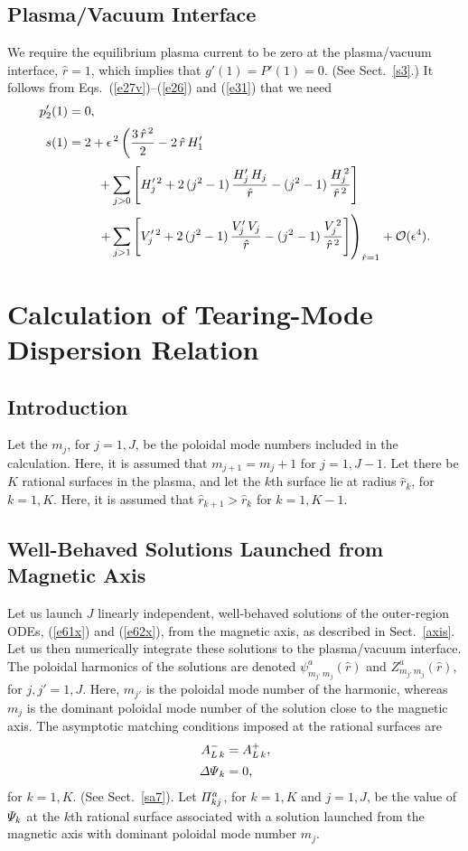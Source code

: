 \documentclass[12pt,prb,aps]{revtex4-1}
\begin{document}
\subsection{Plasma/Vacuum Interface}
We require the equilibrium plasma current to be zero at the plasma/vacuum interface, $\hat{r}=1$, which
implies that $g'(1)=P'(1)= 0$. (See Sect.~\ref{s3}.) It follows from Eqs.~(\ref{e27v})--(\ref{e26}) and (\ref{e31}) that we need\,\cite{am1}
\begin{align}
p_2'(1) &= 0,\label{e222}\\[0.5ex]
s(1) &= 2+ \epsilon^{\,2}\left(\frac{3\,\hat{r}^{\,2}}{2}-2\,\hat{r}\,H_1'\right.\nonumber\\[0.5ex]
&\phantom{===}
+\sum_{j>0}\left[H_j'^{\,2}+2\,(j^2-1)\,\frac{H_j'\,H_j}{\hat{r}}-(j^2-1)\,\frac{H_j^{\,2}}{\hat{r}^{\,2}}\right]\nonumber\\[0.5ex]
&\phantom{===}\left.+\sum_{j>1}\left[V_j'^{\,2}+2\,(j^2-1)\,\frac{V_j'\,V_j}{\hat{r}}-(j^2-1)\,\frac{V_j^{\,2}}{\hat{r}^{\,2}}\right]\right)_{\hat{r}=1}
+{\cal O}(\epsilon^4).\label{e223}
\end{align}


\section{Calculation of  Tearing-Mode Dispersion Relation}
\subsection{Introduction}
Let the $m_j$, for $j=1,J$, be the poloidal mode numbers included in the calculation. Here, it is assumed that $m_{j+1}=m_j+1$ for $j=1,J-1$. 
Let there be $K$ rational surfaces in the plasma, and let the $k$th surface lie at radius $\hat{r}_k$, for $k=1,K$. Here,
it is assumed that $\hat{r}_{k+1}>\hat{r}_k$ for $k=1,K-1$. 

\subsection{Well-Behaved Solutions Launched from Magnetic Axis}\label{axisl}
Let us launch $J$ linearly independent, well-behaved solutions of the outer-region ODEs, (\ref{e61x}) and (\ref{e62x}), from the
magnetic axis, as described in Sect.~\ref{axis}. Let us then numerically integrate these solutions to the plasma/vacuum interface. The poloidal harmonics of
the solutions are denoted $\psi^a_{m_{j'}\,m_j}(\hat{r})$ and $Z^a_{m_{j'}\,m_j}(\hat{r})$, for $j,j'=1,J$. Here,
$m_{j'}$ is the poloidal mode number of the harmonic, whereas $m_j$ is the dominant poloidal mode number of the solution close to the
magnetic axis. The asymptotic matching conditions imposed at the rational surfaces are
\begin{align}
A_{L\,k}^{-} &= A_{L\,k}^+,\\[0.5ex]
{\mit\Delta\Psi}_k &= 0,
\end{align}
for $k=1,K$. (See Sect.~\ref{sa7}). 
Let ${\mit\Pi}_{kj}^a$, for   $k=1,K$ and $j=1,J$,  be the value of ${\mit\Psi}_k$ at the $k$th rational surface associated with a solution launched
from the magnetic axis with dominant poloidal mode number $m_j$. 
\end{document}
